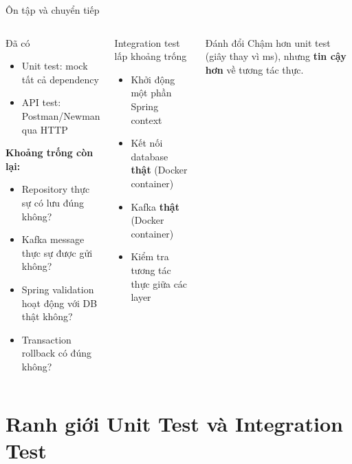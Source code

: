 \documentclass[aspectratio=169,10pt]{beamer}
\begin{document}
\begin{frame}{Ôn tập và chuyển tiếp}
  \begin{columns}
    \begin{block}{Đã có}
      \begin{itemize}
        \item Unit test: mock tất cả dependency
        \item API test: Postman/Newman qua HTTP
      \end{itemize}
      \textbf{Khoảng trống còn lại:}
      \begin{itemize}
        \item Repository thực sự có lưu đúng không?
        \item Kafka message thực sự được gửi không?
        \item Spring validation hoạt động với DB thật không?
        \item Transaction rollback có đúng không?
      \end{itemize}
    \end{block}

    \begin{block}{Integration test lấp khoảng trống}
      \begin{itemize}
        \item Khởi động một phần Spring context
        \item Kết nối database \textbf{thật} (Docker container)
        \item Kafka \textbf{thật} (Docker container)
        \item Kiểm tra tương tác thực giữa các layer
      \end{itemize}
    \end{block}
    \begin{alertblock}{Đánh đổi}
      Chậm hơn unit test (giây thay vì ms),
      nhưng \textbf{tin cậy hơn} về tương tác thực.
    \end{alertblock}
  \end{columns}
\end{frame}

\section{Ranh giới Unit Test và Integration Test}
\end{document}
